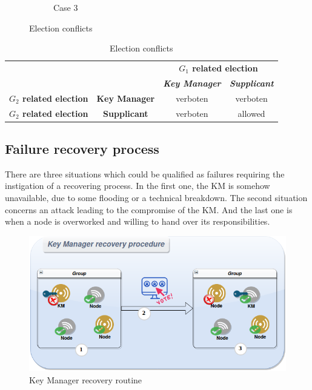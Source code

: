 \begin{figure}
\begin{subfigure}[htbp]{0.3\textwidth}
		\caption{Case 3}
		\label{fig:case3}
	\end{subfigure}
	\caption{Election conflicts}
	\label{fig:election_conflicts}
\end{figure}

\begin{table}[htbp]
	\caption{Election conflicts}
	\begin{center}
		\begin{tabular}{|c|c|c|c|}
			\hline
			\multicolumn{2}{|c|}{}&\multicolumn{2}{|c|}{\textbf{$G_1$ related election}} \\
			\cline{3-4} 
			\multicolumn{2}{|c|}{}& \textbf{\textit{Key Manager}}& \textbf{\textit{Supplicant}} \\
			\hline
			\textbf{$G_2$ related election}& \textbf{Key Manager}& verboten & verboten\\
			\cline{2-4}%
			\textbf{$G_2$ related election}& \textbf{Supplicant} & verboten & allowed\\
			\hline
		\end{tabular}
		\label{tab:election_conflicts}
	\end{center}
\end{table}

\subsection{Failure recovery process}

There are three situations which could be qualified as failures requiring the instigation of a recovering process. In the first one, the KM is somehow unavailable, due to some flooding or a technical breakdown. The second situation concerns an attack leading to the compromise of the KM. And the last one is when a node is overworked and willing to hand over its responsibilities.

\begin{figure}[htbp]
	\centerline{\includegraphics[scale=0.50]{figures/recovery.png}}
	\caption{Key Manager recovery routine}
	\label{fig:km_recovery}
\end{figure}

